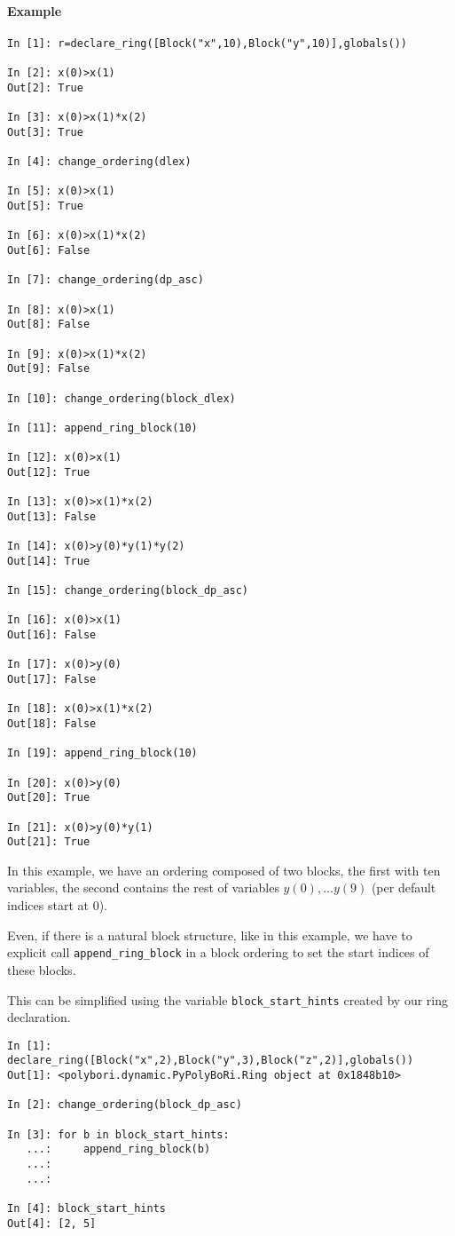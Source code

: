 \documentclass[]{article}
\begin{document}
\paragraph{Example}
\begin{verbatim}
In [1]: r=declare_ring([Block("x",10),Block("y",10)],globals())

In [2]: x(0)>x(1)
Out[2]: True

In [3]: x(0)>x(1)*x(2)
Out[3]: True

In [4]: change_ordering(dlex)

In [5]: x(0)>x(1)
Out[5]: True

In [6]: x(0)>x(1)*x(2)
Out[6]: False

In [7]: change_ordering(dp_asc)

In [8]: x(0)>x(1)
Out[8]: False

In [9]: x(0)>x(1)*x(2)
Out[9]: False

In [10]: change_ordering(block_dlex)

In [11]: append_ring_block(10)

In [12]: x(0)>x(1)
Out[12]: True

In [13]: x(0)>x(1)*x(2)
Out[13]: False

In [14]: x(0)>y(0)*y(1)*y(2)
Out[14]: True

In [15]: change_ordering(block_dp_asc)

In [16]: x(0)>x(1)
Out[16]: False

In [17]: x(0)>y(0)
Out[17]: False

In [18]: x(0)>x(1)*x(2)
Out[18]: False

In [19]: append_ring_block(10)

In [20]: x(0)>y(0)
Out[20]: True

In [21]: x(0)>y(0)*y(1)
Out[21]: True
\end{verbatim}
In this example, we have an ordering composed of two blocks, the first with ten variables, the second contains the rest of variables $y(0), \ldots y(9)$ (per default indices start at 0).

Even, if there is a natural block structure, like in this example, we have to explicit call \verb|append_ring_block| in a block ordering to set the start indices of these blocks.

This can be simplified using the variable \verb|block_start_hints| created by our ring declaration.

\begin{verbatim}
In [1]: declare_ring([Block("x",2),Block("y",3),Block("z",2)],globals())
Out[1]: <polybori.dynamic.PyPolyBoRi.Ring object at 0x1848b10>

In [2]: change_ordering(block_dp_asc)

In [3]: for b in block_start_hints:
   ...:     append_ring_block(b)
   ...:     
   ...:     

In [4]: block_start_hints
Out[4]: [2, 5]
\end{verbatim}
\end{document}
